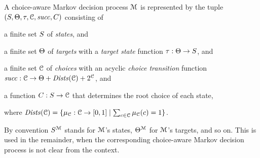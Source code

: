 \begin{definition}
\label{def:CMDP}
A choice-aware Markov decision process $\mathcal{M}$ is represented by the tuple $(S, \Theta, \tau, \mathcal{C}, \mathit{succ}, C)$ consisting of
\begin{compactitem}
\item a finite set $S$ of \emph{states}, and
\item a finite set $\Theta$ of \emph{targets} with a \emph{target state} function $\tau : \Theta \to S$, and
\item a finite set $\mathcal{C}$ of \emph{choices} with an acyclic \emph{choice transition} function $\mathit{succ} : \mathcal{C} \rightarrow \Theta + \mathit{Dists}(\mathcal{C}) + 2^{\mathcal{C}}$, and
\item a function $C : S \rightarrow \mathcal{C}$ that determines the root choice of each state,
\end{compactitem}
where $\mathit{Dists}(\mathcal{C}) = \{ \mu_{\mathcal{C}} : \mathcal{C} \to [0,1] \mid \sum_{c \in \mathcal{C}} \mu_{\mathcal{C}}(c) = 1 \}$.
\end{definition}


By convention $S^{\mathcal{M}}$ stands for $\mathcal{M}$'s states, $\Theta^{\mathcal{M}}$ for $\mathcal{M}$'s targets, and so on.
This is used in the remainder, when the corresponding choice-aware Markov decision process is not clear from the context.


